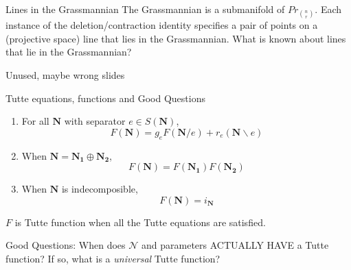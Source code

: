 \documentclass{beamer}
\newcommand{\ext}[1]{\ensuremath{\mathbf{#1}}}
\begin{document}
\begin{frame}{Lines in the Grassmannian}
  The Grassmannian is a submanifold of $Pr_{\binom{n}{r}}$. Each instance of the
  deletion/contraction identity specifies a pair of points on a (projective
  space) line that lies in the Grassmannian.  What is known about lines that
  lie in the Grassmannian?
\end{frame}
  


\begin{frame}{Unused, maybe wrong slides}
\end{frame}
 


 


\begin{frame}{Tutte equations, functions and Good Questions}
  \begin{enumerate}
  \item For all $\ext{N}$ with separator $e\in S(\ext{N})$,
    \[
    F(\ext{N}) = g_eF(\ext{N}/e) + r_e(\ext{N}\backslash e)
    \]
  \item When $\ext{N}=\ext{N_1}\oplus\ext{N_2}$,
    \[
    F(\ext{N}) = F(\ext{N_1})F(\ext{N_2})
    \]
  \item When $\ext{N}$ is indecomposible,
    \[
    F(\ext{N}) = i_{\ext{N}}
    \]
  \end{enumerate}
  $F$ is Tutte function when all the Tutte equations are satisfied.

  
  
  Good Questions: When does $\mathcal{N}$ and parameters ACTUALLY
  HAVE a Tutte function?  If so, what is a \emph{universal} Tutte function?

\end{frame}
\end{document}
